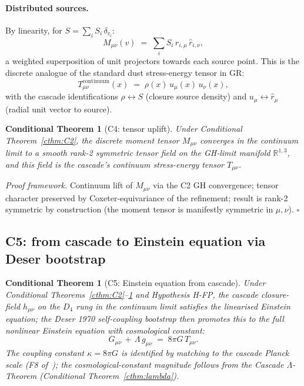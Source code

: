 \documentclass[11pt]{article}
\theoremstyle{plain}
\newtheorem{conditional}[theorem]{Conditional Theorem}
\theoremstyle{definition}
\theoremstyle{remark}
\begin{document}
\paragraph{Distributed sources.}
By linearity, for $S = \sum_i S_i \, \delta_{v_i}$:
\[
  M_{\mu\nu}(v) \;=\; \sum_i S_i \, \hat r_{i,\mu} \, \hat r_{i,\nu},
\]
a weighted superposition of unit projectors towards each source point. This is the discrete analogue of the standard dust stress-energy tensor in GR:
\[
  T_{\mu\nu}^{\mathrm{continuum}}(x) \;=\; \rho(x) \, u_\mu(x) \, u_\nu(x),
\]
with the cascade identifications $\rho \leftrightarrow S$ (closure source density) and $u_\mu \leftrightarrow \hat r_\mu$ (radial unit vector to source).

\begin{conditional}[C4: tensor uplift]\label{cthm:C4}
Under Conditional Theorem~\ref{cthm:C2}, the discrete moment tensor $M_{\mu\nu}$ converges in the continuum limit to a smooth rank-2 symmetric tensor field on the GH-limit manifold $\mathbb{R}^{1,3}$, and this field is the cascade's continuum stress-energy tensor $T_{\mu\nu}$.
\end{conditional}

\noindent\emph{Proof framework.} Continuum lift of $M_{\mu\nu}$ via the C2 GH convergence; tensor character preserved by Coxeter-equivariance of the refinement; result is rank-2 symmetric by construction (the moment tensor is manifestly symmetric in $\mu, \nu$). \hfill$\square$

\subsection{C5: from cascade to Einstein equation via Deser bootstrap}\label{sec:gravity-C5}

\begin{conditional}[C5: Einstein equation from cascade]\label{cthm:C5}
Under Conditional Theorems~\ref{cthm:C2}--\ref{cthm:C4} and Hypothesis H-FP, the cascade closure-field $h_{\mu\nu}$ on the $D_4$ rung in the continuum limit satisfies the linearised Einstein equation; the Deser 1970 self-coupling bootstrap then promotes this to the full nonlinear Einstein equation with cosmological constant:
\[
  G_{\mu\nu} \,+\, \Lambda \, g_{\mu\nu} \;=\; 8\pi G \, T_{\mu\nu}.
\]
The coupling constant $\kappa = 8\pi G$ is identified by matching to the cascade Planck scale (F8 of~\citealp{SmartXXXVI}); the cosmological-constant magnitude follows from the Cascade $\Lambda$-Theorem (Conditional Theorem~\ref{cthm:lambda}).
\end{conditional}
\end{document}
